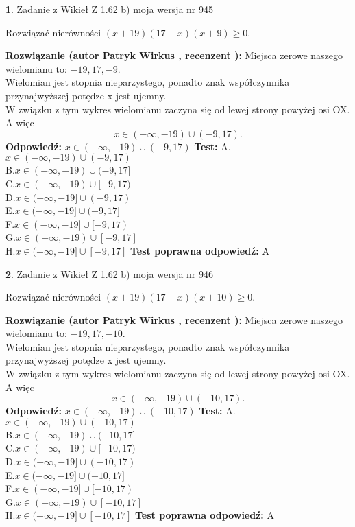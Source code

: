 \documentclass[12pt, a4paper]{article}
\theoremstyle{definition} %
\newtheorem{zad}{}
\newcommand{\zadStart}[1]{\begin{zad}#1\newline}
\newcommand{\zadStop}{\end{zad}}
\newcommand{\rozwStart}[2]{\noindent \textbf{Rozwiązanie (autor #1 , recenzent #2): }\newline}
\newcommand{\rozwStop}{\newline}
\newcommand{\odpStart}{\noindent \textbf{Odpowiedź:}\newline}
\newcommand{\odpStop}{\newline}
\newcommand{\testStart}{\noindent \textbf{Test:}\newline}
\newcommand{\testStop}{\newline}
\newcommand{\kluczStart}{\noindent \textbf{Test poprawna odpowiedź:}\newline}
\newcommand{\kluczStop}{\newline}
\begin{document}
\zadStart{Zadanie z Wikieł Z 1.62 b) moja wersja nr 945}

Rozwiązać nierówności $(x+19)(17-x)(x+9)\ge0$.
\zadStop
\rozwStart{Patryk Wirkus}{}
Miejsca zerowe naszego wielomianu to: $-19, 17, -9$.\\
Wielomian jest stopnia nieparzystego, ponadto znak współczynnika przy\linebreak najwyższej potędze x jest ujemny.\\ W związku z tym wykres wielomianu zaczyna się od lewej strony powyżej osi OX. A więc $$x \in (-\infty,-19) \cup (-9,17).$$
\rozwStop
\odpStart
$x \in (-\infty,-19) \cup (-9,17)$
\odpStop
\testStart
A.$x \in (-\infty,-19) \cup (-9,17)$\\
B.$x \in (-\infty,-19) \cup (-9,17]$\\
C.$x \in (-\infty,-19) \cup [-9,17)$\\
D.$x \in (-\infty,-19] \cup (-9,17)$\\
E.$x \in (-\infty,-19] \cup (-9,17]$\\
F.$x \in (-\infty,-19] \cup [-9,17)$\\
G.$x \in (-\infty,-19) \cup [-9,17]$\\
H.$x \in (-\infty,-19] \cup [-9,17]$
\testStop
\kluczStart
A
\kluczStop



\zadStart{Zadanie z Wikieł Z 1.62 b) moja wersja nr 946}

Rozwiązać nierówności $(x+19)(17-x)(x+10)\ge0$.
\zadStop
\rozwStart{Patryk Wirkus}{}
Miejsca zerowe naszego wielomianu to: $-19, 17, -10$.\\
Wielomian jest stopnia nieparzystego, ponadto znak współczynnika przy\linebreak najwyższej potędze x jest ujemny.\\ W związku z tym wykres wielomianu zaczyna się od lewej strony powyżej osi OX. A więc $$x \in (-\infty,-19) \cup (-10,17).$$
\rozwStop
\odpStart
$x \in (-\infty,-19) \cup (-10,17)$
\odpStop
\testStart
A.$x \in (-\infty,-19) \cup (-10,17)$\\
B.$x \in (-\infty,-19) \cup (-10,17]$\\
C.$x \in (-\infty,-19) \cup [-10,17)$\\
D.$x \in (-\infty,-19] \cup (-10,17)$\\
E.$x \in (-\infty,-19] \cup (-10,17]$\\
F.$x \in (-\infty,-19] \cup [-10,17)$\\
G.$x \in (-\infty,-19) \cup [-10,17]$\\
H.$x \in (-\infty,-19] \cup [-10,17]$
\testStop
\kluczStart
A
\kluczStop
\end{document}
